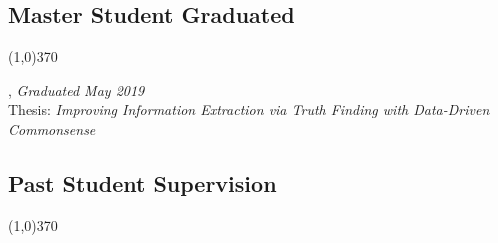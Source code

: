 \documentclass[10pt]{article}
\newenvironment{myindentpar}[1]%
{\begin{list}{}%
         {\setlength{\leftmargin}{#1}}%
         \item[]%
}
{\end{list}}
\newcounter{list}
\newcommand{\hide}[1]{}
\begin{document}
\hide{
\subsection{\sc Notre Dame Invited Presentations}
\vspace{-0.4cm} \line(1,0){370} \vspace{-0.1cm}

\begin{myindentpar}{0.75cm}

\hspace{-0.75cm} Graduate Seminar, Department of Psychology, October 2018

\end{myindentpar}
}

\subsection{\sc Master Student Graduated}
\vspace{-0.4cm} \line(1,0){370} \vspace{-0.1cm}

\begin{myindentpar}{0.75cm}

\hspace{-0.75cm}{\bf Xueying Wang}, \emph{Graduated May 2019} \\
	{\small Thesis: \emph{Improving Information Extraction via Truth Finding with Data-Driven Commonsense}}

\end{myindentpar}

\subsection{\sc Past Student Supervision}
\vspace{-0.4cm} \line(1,0){370} \vspace{-0.1cm}
\end{document}
